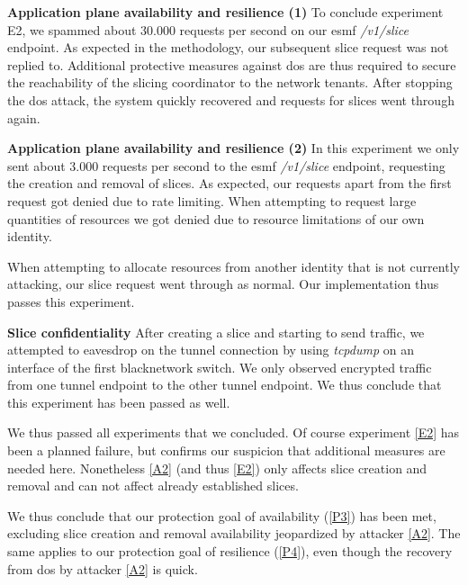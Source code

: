 \begin{description}[style=multiline, labelwidth=0.7cm]

    \item[\ref{E2}] \textbf{Application plane availability and resilience (1)} To conclude experiment E2, we spammed about 30.000 requests per second on our \acrshort{esmf} \textit{/v1/slice} endpoint. As expected in the methodology, our subsequent slice request was not replied to. Additional protective measures against \acrshort{dos} are thus required to secure the reachability of the slicing coordinator to the network tenants. After stopping the \acrshort{dos} attack, the system quickly recovered and requests for slices went through again.

    \item[\ref{E3}] \textbf{Application plane availability and resilience (2)} In this experiment we only sent about 3.000 requests per second to the \acrshort{esmf} \textit{/v1/slice} endpoint, requesting the creation and removal of slices. As expected, our requests apart from the first request got denied due to rate limiting. When attempting to request large quantities of resources we got denied due to resource limitations of our own identity.

    When attempting to allocate resources from another identity that is not currently attacking, our slice request went through as normal. Our implementation thus passes this experiment.

    \item[\ref{E4}] \textbf{Slice confidentiality} After creating a slice and starting to send traffic, we attempted to eavesdrop on the tunnel connection by using \textit{tcpdump} on an interface of the first \gls{blacknetwork} switch. We only observed encrypted traffic from one tunnel endpoint to the other tunnel endpoint. We thus conclude that this experiment has been passed as well.
\end{description}

We thus passed all experiments that we concluded. Of course experiment \ref{E2} has been a planned failure, but confirms our suspicion that additional measures are needed here. Nonetheless \ref{A2} (and thus \ref{E2}) only affects slice creation and removal and can not affect already established slices.

We thus conclude that our protection goal of availability (\ref{P3}) has been met, excluding slice creation and removal availability jeopardized by attacker \ref{A2}. The same applies to our protection goal of resilience (\ref{P4}), even though the recovery from \acrshort{dos} by attacker \ref{A2} is quick.

